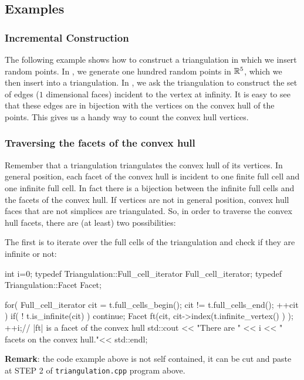 
\subsection{Examples}

\subsubsection{Incremental Construction}

The following example shows how to construct a triangulation in which we insert
random points. In , we generate one hundred random points in
$\mathbb R^5$, which we then insert into a triangulation. In , we 
ask the triangulation to construct the set of edges
($1$ dimensional faces) incident to the vertex at infinity. It is easy to see that
these edges are in bijection with the vertices on the convex hull of the
points. This gives us a handy way to count the convex hull vertices. 


\subsubsection{Traversing the facets of the convex hull}

Remember that a triangulation triangulates the convex hull of its
vertices. 
In general position, each
facet of the convex hull is incident to one finite full cell and one infinite
full cell. In fact there is a bijection between the infinite full cells and the
facets of the convex hull. 
If vertices are not in general position, convex hull faces that are
not simplices are triangulated.
So, in order to traverse the convex hull facets,
there are (at least) two possibilities:

The first is to iterate over the full cells of the triangulation and check if they
are infinite or not:

\begin{ccExampleCode}
{int i=0;
typedef Triangulation::Full_cell_iterator Full_cell_iterator;
typedef Triangulation::Facet Facet;

for( Full_cell_iterator cit = t.full_cells_begin(); 
      cit != t.full_cells_end(); ++cit ) {
    if( ! t.is_infinite(cit) )
        continue;
    Facet ft(cit, cit->index(t.infinite_vertex() ) ); 
    ++i;// |ft| is a facet of the convex hull
}
std::cout << "There are " << i << " facets on the convex hull."<< std::endl;}
\end{ccExampleCode}%
\textbf{Remark}: the code example above is not self contained, it can
be cut and paste at STEP 2 of {\tt triangulation.cpp} program above.


